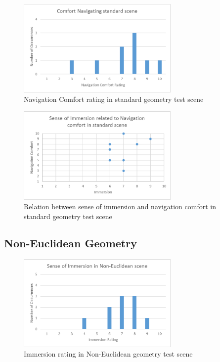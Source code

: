 			\begin{figure}[H]
				\includegraphics[width=0.7\textwidth]{Images/Standard_Comfort}
				\centering
				\caption{Navigation Comfort rating in standard geometry test scene}
				\label{exp:fig:standard_comfort}
			\end{figure}

			\begin{figure}[H]
				\includegraphics[width=0.7\textwidth]{Images/Standard_Relation}
				\centering
				\caption{Relation between sense of immersion and navigation comfort in standard geometry test scene}
				\label{exp:fig:standard_relation}
			\end{figure}

		\subsection{Non-Euclidean Geometry}
		\label{exp:exp:ne}


			\begin{figure}[H]
				\includegraphics[width=0.7\textwidth]{Images/NE_Immersion}
				\centering
				\caption{Immersion rating in Non-Euclidean geometry test scene}
				\label{exp:fig:ne_immersion}
			\end{figure}

